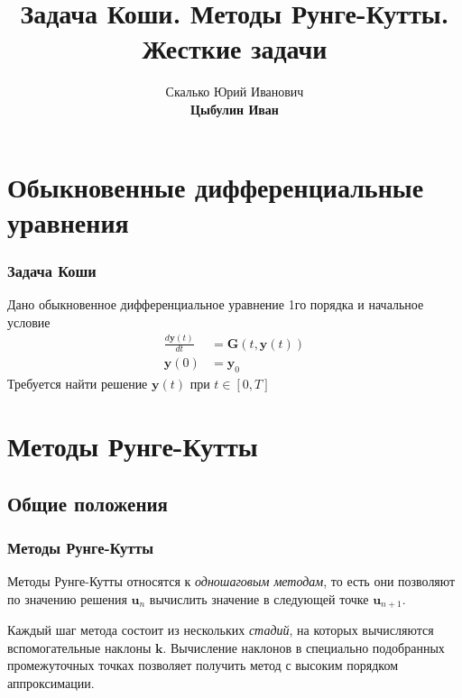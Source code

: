 \documentclass[professionalfonts,compress,unicode,aspectratio=169]{beamer}
\title[Методы Рунге-Кутты]{Задача Коши. Методы Рунге-Кутты. Жесткие задачи}
\author[Цыбулин И.В.]{Скалько Юрий Иванович\\
\textbf{Цыбулин Иван}}
\date{}
\begin{document}
\begin{frame}[plain]
\titlepage
\end{frame}

\def\L{\mathcal{L}}
\renewcommand{\vec}[1]{\boldsymbol{\mathbf{#1}}}

\section{Обыкновенные дифференциальные уравнения}
\begin{frame}\frametitle{Задача Коши}
	Дано обыкновенное дифференциальное уравнение 1го порядка и начальное условие
	\begin{align*}
	\frac{d\vec y(t)}{dt} &= \vec G(t, \vec y(t))\\
	\vec y(0) &= \vec y_0
	\end{align*}
	Требуется найти решение $\vec y(t)$ при $t \in [0, T]$
\end{frame}

\section{Методы Рунге-Кутты}
\subsection{Общие положения}
\begin{frame}\frametitle{Методы Рунге-Кутты}
	Методы Рунге-Кутты относятся к \emph{одношаговым методам}, то есть они позволяют по
	значению решения $\vec u_{n}$ вычислить значение в следующей точке $\vec u_{n+1}$.

	Каждый шаг метода состоит из нескольких \emph{стадий}, на которых вычисляются вспомогательные
	наклоны $\vec k$. Вычисление наклонов в специально подобранных промежуточных точках позволяет
	получить метод с высоким порядком аппроксимации.
\end{frame}
\end{document}
